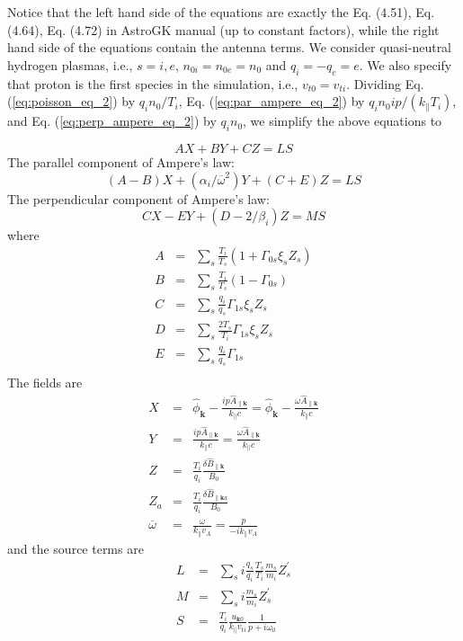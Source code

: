 \documentclass[12pt]{article}
\begin{document}
Notice that the left hand side of the equations are exactly the Eq. (4.51), Eq. (4.64), Eq. (4.72) in AstroGK manual (up to constant factors), while  the right hand side of the equations contain the antenna terms. We consider quasi-neutral hydrogen plasmas, i.e., $s = i, e$, $n_{0i}=n_{0e} = n_0$ and $q_i = -q_e = e$.  We also specify that proton is the first species in the simulation, i.e., $v_{t0}=v_{ti}$. Dividing Eq. (\ref{eq:poisson_eq_2}) by $q_i n_0 /T_i$,  Eq. (\ref{eq:par_ampere_eq_2}) by $q_i n_0 ip / (k_\parallel T_i)$, and Eq. (\ref{eq:perp_ampere_eq_2}) by $q_i n_0$, we simplify the above equations to 

\begin{equation}
AX + BY + CZ= LS
\end{equation}
The parallel component of Ampere's law:
\begin{equation}
(A-B) X + (\alpha_i / \overline{\omega}^2) Y + (C + E) Z = LS
\end{equation}
The perpendicular component of Ampere's law:
\begin{equation}
CX-EY + (D-2/\beta_i)Z = MS
\end{equation}
where
%
\begin{eqnarray}
A &=& \sum_s \frac{T_i}{T_s} (1 + \Gamma_{0s}\xi_s Z_s) \\
B &=& \sum_s \frac{T_i}{T_s} (1 - \Gamma_{0s}) \\
C &=& \sum_s \frac{q_i}{q_s} \Gamma_{1s} \xi_s Z_s \\
D &=& \sum_s \frac{2T_s}{T_i}\Gamma_{1s} \xi_s Z_s \\
E &=& \sum_s \frac{q_i}{q_s} \Gamma_{1s} \\
\end{eqnarray}
%
The fields are
\begin{eqnarray}
X &=& \hat{\phi}_{\mathbf{k}} - \frac{ip\hat{A}_{\parallel \mathbf{k}}}{k_\parallel c} = \hat{\phi}_{\mathbf{k}} - \frac{\omega\hat{A}_{\parallel \mathbf{k}}}{k_\parallel c} \\
Y &=& \frac{ip\hat{A}_{\parallel \mathbf{k}}}{k_\parallel c} = \frac{\omega\hat{A}_{\parallel \mathbf{k}}}{k_\parallel c} \\
Z &=& \frac{T_i}{q_i} \frac{\delta \hat{B}_{\parallel \mathbf{k}}}{B_0} \\
Z_a &=& \frac{T_i}{q_i} \frac{\delta \hat{B}_{\parallel \mathbf{k}a}}{B_0} \\
\overline{\omega} &=& \frac{\omega}{k_\parallel v_A} = \frac{p}{-ik_\parallel v_A}
\end{eqnarray}
%
and the source terms are
\begin{eqnarray}
L &=&\sum_s i \frac{q_s}{q_i}\frac{T_s}{T_i}\frac{m_s}{m_i}Z^\prime_s \\
M &=& \sum_s i\frac{m_s}{m_i}Z^\prime_s \\
S &=& \frac{T_i}{q_i} \frac{u_{\mathbf{k}0}}{k_\parallel v_{ti}}\frac{1}{p+i\omega_0}
\end{eqnarray}
\end{document}
